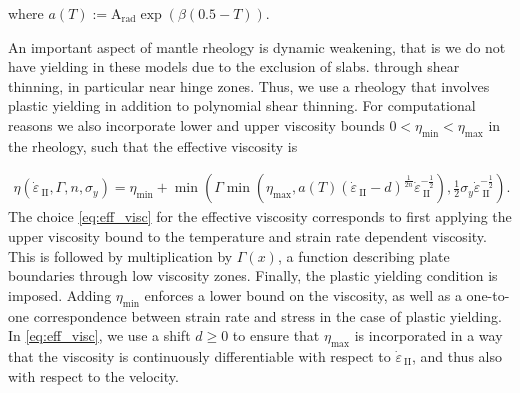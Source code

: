 \documentclass[12pt]{article}
\newcommand{\mgnote}[1]{\textcolor{magenta}{MG: #1}}
\newcommand{\IIinv}{{\dot\varepsilon}_{\mathrm{\!\!\:II}}}
\begin{document}
where $a(T):=\text{A}_{\text{rad}}\exp(\beta(0.5-T))$. 



An important aspect of mantle rheology is dynamic weakening, that is we do not have yielding in these models due to the exclusion of slabs.
through shear thinning, in particular near hinge zones. Thus, 
we use a rheology that involves
plastic yielding in addition to polynomial shear thinning. For
computational reasons we also
incorporate lower and upper viscosity bounds
$0 < \eta_{\min} < \eta_{\max}$ in the rheology, such that the effective viscosity is


\begin{multline}
  \label{eq:eff_visc}
  \eta(\IIinv,\Gamma, n, \sigma_{y})=\eta_{\min}+\min(\Gamma\min(\eta_{\max}, a(T)(\IIinv-d)^{\frac{1}{2n}}\IIinv^{-\frac{1}{2}}),\frac{1}{2}\sigma_y\IIinv^{-\frac{1}{2}}).
\end{multline}
 The choice
\eqref{eq:eff_visc} for the effective viscosity corresponds to first
applying the upper viscosity bound to the temperature and strain rate
dependent viscosity. This is followed by multiplication by
$\Gamma(x)$, a function describing plate boundaries through low viscosity
zones. Finally, the plastic yielding condition is imposed. Adding
$\eta_{\min}$ enforces a lower bound on the viscosity, as well as a
one-to-one correspondence between strain rate and stress in the case
of plastic yielding.
In \eqref{eq:eff_visc}, we use a shift $d\ge 0$ to ensure that $\eta_{\max}$ is incorporated
in a way that the viscosity is continuously differentiable with
respect to $\IIinv$, and thus also with
respect to the velocity.  
\end{document}

